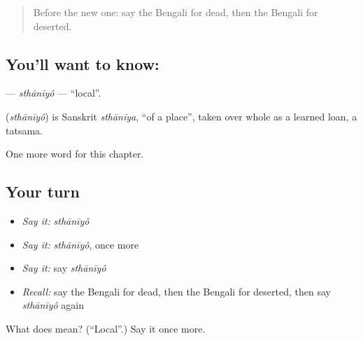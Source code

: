\label{lesson:BN-C219-sthaniyo}



\begin{quote}
Before the new one: say the Bengali for dead, then the Bengali for deserted.
\end{quote}

\subsection*{You'll want to know: }
\textbf{} — \emph{sthānīyô} — \textquotedblleft{}local\textquotedblright{}.

\begin{cousinweb}
\textbf{} (\emph{sthānīyô}) is Sanskrit \emph{sthānīya}, \textquotedblleft{}of a place\textquotedblright{}, taken over whole as a learned loan, a tatsama.
\end{cousinweb}

\begin{grammarlens}[title={What you've built}]
One more word for this chapter.
\end{grammarlens}

\subsection*{Your turn}
\begin{itemize}
\raggedright
  \item \emph{Say it:} \emph{sthānīyô}
  \item \emph{Say it:} \emph{sthānīyô}, once more
  \item \emph{Say it:} say \emph{sthānīyô}
  \item \emph{Recall:} say the Bengali for dead, then the Bengali for deserted, then say \emph{sthānīyô} again
\end{itemize}

\begin{tcolorbox}[breakable,colback=teal!4,colframe=teal!35!black,title={Before you move on}]
What does  mean? (\textquotedblleft{}Local\textquotedblright{}.) Say it once more.
\end{tcolorbox}
